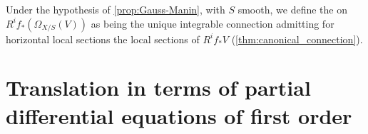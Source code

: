 \begin{para}
  Under the hypothesis of \ref{prop:Gauss-Manin}, with $S$ smooth, we define
  the  on $R^if_{\ast}(\Omega_{X/S}(V))$ as
  being the unique integrable connection admitting for horizontal local sections
  the local sections of $R^if_{\ast}V$ (\ref{thm:canonical_connection}).
\end{para}











\clearpage
\section{Translation in terms of partial differential equations of first order}
